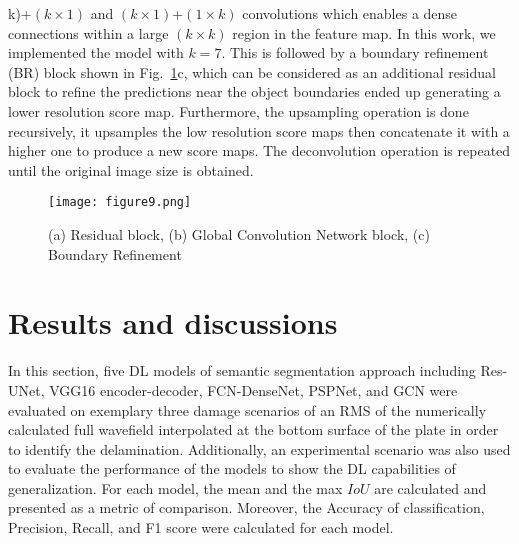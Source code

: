 \documentclass[runningheads]{llncs}
\begin{document}
k)\)+\((k\times 1)\) and \((k\times 1)\)+\((1\times k)\) convolutions which 
enables a dense connections within a large \((k\times k)\) region in the 
feature map.
In this work, we implemented the model with \(k=7\).
This is followed by a boundary refinement (BR) block shown in Fig.~\ref{fig:res_gcn_br}c, which can be considered as an additional residual block to refine the predictions near the object boundaries ended up generating a lower resolution score map. 
Furthermore, the upsampling operation is done recursively, it upsamples the low 
resolution score maps then concatenate it with a higher one to produce a new 
score maps.
The deconvolution operation is repeated until the original image size is 
obtained.
\begin{figure} [ht!]
	\begin{center}
		\texttt{[image: figure9.png]}
	\end{center}
	\caption{(a) Residual block, (b) Global Convolution Network block, (c) 
		Boundary Refinement} 
	\label{fig:res_gcn_br}
\end{figure}
\section{Results and discussions}
\label{section:results_and_discussions}
In this section, five DL models of semantic segmentation approach including  Res-UNet, VGG16 encoder-decoder, FCN-DenseNet, PSPNet, and GCN were evaluated on exemplary three damage scenarios of an RMS of the numerically calculated full wavefield interpolated at the bottom surface of the plate in order to identify the delamination.
Additionally, an experimental scenario was also used to evaluate the performance of the models to show the DL capabilities of generalization.
For each model, the mean and the max \(IoU\) are calculated and presented as a metric of comparison.
Moreover, the Accuracy of classification, Precision, Recall, and F1 score were calculated for each model.
%
\end{document}
